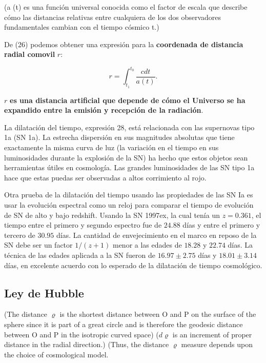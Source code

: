 \documentclass[11pt]{article}
\begin{document}
(a (t) es una función universal conocida como el factor de escala que describe cómo las distancias relativas entre cualquiera de los dos observadores fundamentales cambian con el tiempo cósmico t.)

De (26) podemos obtener una expresión para la {\bf{coordenada de distancia radial comovil}} $r$:

    \begin{equation}
        r = \int_{t_1}^{t_0}{\frac{c dt }{a (t)}}.
    \end{equation} 

    $r$ {\bf{es una distancia artificial que depende de cómo el Universo se ha expandido entre la emisión y recepción de la radiación}}.

La dilatación del tiempo, expresión 28, está relacionada con las supernovas tipo 1a (SN 1a). La estrecha dispersión en sus magnitudes absolutas que tiene exactamente la misma curva de luz  (la variación en el tiempo en sus luminosidades durante la explosión de la SN) ha hecho que estos objetos sean herramientas útiles en cosmología. Las grandes luminosidades de las SN tipo 1a hace que estas puedas ser observadas a altos corrimiento al rojo. 


Otra prueba de la dilatación del tiempo usando las propiedades de las SN Ia es usar la evolución espectral como un reloj para comparar el tiempo de evolución de SN de alto y bajo redshift. Usando la SN 1997ex, la cual tenía un $z= 0.361$, el tiempo entre el primero y segundo espectro fue de $24.88$ días y entre el primero y tercero de $30.95$ días. La cantidad de envejecimiento en el marco en reposo de la SN debe ser un factor $1/(z+1)$ menor a las edades de $18.28$ y $22.74$ días. La técnica de las edades aplicada a la SN fueron de $16.97 \pm 2.75$ días y $18.01 \pm 3.14$ días, en excelente acuerdo con lo esperado de la dilatación de tiempo cosmológico. 


\subsection{Ley de Hubble} 

(The distance $\varrho$ is the shortest distance between O and P on the surface of the sphere
since it is part of a great circle and is therefore the geodesic distance between O and
P in the isotropic curved space)
($d \varrho$ is an increment of proper distance in the radial direction.)
(Thus, the distance $\varrho$ measure depends upon the choice of cosmological model.
\end{document}
